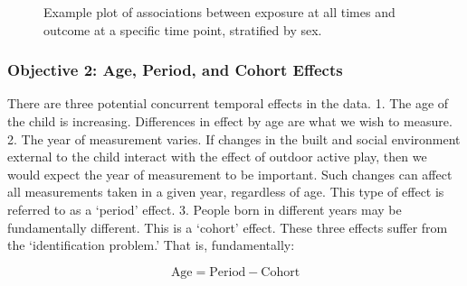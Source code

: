 \documentclass [11pt]{article}
\begin{document}
\begin{figure}
\centering
{}
\caption{Example plot of associations between exposure at all times and outcome at a specific time point, stratified by sex.}
\end{figure}

\subsubsection{Objective 2: Age, Period, and Cohort Effects}
There are three potential concurrent temporal effects in the data. 1. The age of the child is increasing. Differences in effect by age are what we wish to measure. 2. The year of measurement varies. If changes in the built and social environment external to the child interact with the effect of outdoor active play, then we would expect the year of measurement to be important. Such changes can affect all measurements taken in a given year, regardless of age. This type of effect is referred to as a `period' effect. 3. People born in different years may be fundamentally different. This is a `cohort' effect. These three effects suffer from the `identification problem.' That is, fundamentally:

\begin{equation}
\mbox{Age} = \mbox{Period} - \mbox{Cohort} \nonumber
\end{equation}
\end{document}

